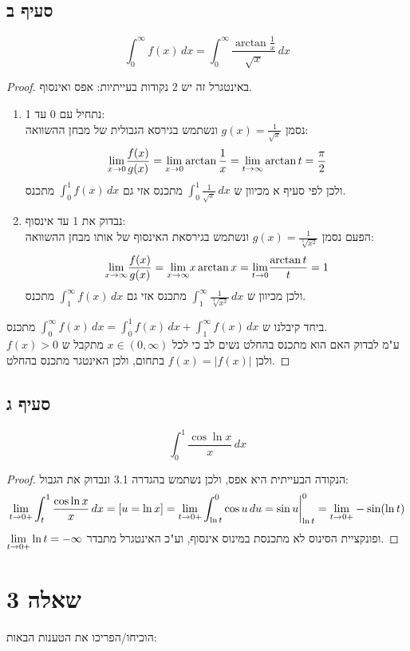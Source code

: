 \documentclass{article}
\begin{document}
	\pagebreak
	\subsection*{סעיף ב}
	\[
		\int_0^\infty f(x) \, dx = \int_0^\infty \frac{\arctan \frac{1}{x}}{\sqrt{x}} \, dx
	\]
	\begin{proof}
		באינטגרל זה יש 2 נקודות בעייתיות: אפס ואינסוף.
		\begin{enumerate}
			\item נתחיל עם 0 עד 1: \\
			נסמן $g(x) = \frac{1}{\sqrt{x}}$ ונשתמש בגירסא הגבולית של מבחן ההשוואה:
			\[
			\displaystyle{\lim_{x \to 0}} \frac{f(x)}{g(x)} = \displaystyle{\lim_{x \to 0}} \arctan \frac{1}{x} = \displaystyle{\lim_{t \to \infty}} \arctan t = \frac{\pi}{2}
			\]
			ולכן לפי סעיף א מכיוון ש $\int_0^1 \frac{1}{\sqrt{x}} \, dx$ מתכנס אזי גם $\int_0^1 f(x) \, dx$ מתכנס.

			\item נבדוק את 1 עד אינסוף: \\
			הפעם נסמן $g(x) = \frac{1}{\sqrt[3]{x^2}}$ ונשתמש בגירסאת האינסוף של אותו מבחן ההשוואה:
			\[
				\displaystyle{\lim_{x \to \infty}} \frac{f(x)}{g(x)} = \displaystyle{\lim_{x \to \infty}} x \arctan x = \displaystyle{\lim_{t \to 0}} \frac{\arctan t}{t} = 1
			\]
			ולכן מכיוון ש $\int_1^\infty \frac{1}{\sqrt[3]{x^2}} \, dx$ מתכנס אזי גם $\int_1^\infty f(x) \, dx$ מתכנס.
		\end{enumerate}
		ביחד קיבלנו ש $\int_0^\infty f(x) \, dx = \int_0^1 f(x) \, dx + \int_1^\infty f(x) \, dx$ מתכנס. \\
		ע"מ לבדוק האם הוא מתכנס בהחלט נשים לב כי לכל $x \in (0, \infty)$ מתקבל ש $f(x) > 0$ ולכן $f(x) = |f(x)|$ בתחום, ולכן האינטגר מתכנס בהחלט.
	\end{proof}

	\subsection*{סעיף ג}
	\[
		\int_0^1 \frac{\cos \ln x}{x} \, dx
	\]
	\begin{proof}
		הנקודה הבעייתית היא אפס, ולכן נשתמש בהגדרה 3.1 ונבדוק את הגבול:
		\[
		\displaystyle{\lim_{t \to 0+}} \int_t^1 \frac{\cos \ln x}{x} \, dx = [u = \ln x] =
		\displaystyle{\lim_{t \to 0+}} \int^0_{\ln t} \cos u \, du = \sin u \biggr|^0_{\ln t} =
		\displaystyle{\lim_{t \to 0+}} -\sin(\ln t)
		\]
		$\displaystyle{\lim_{t \to 0+}} \ln t = -\infty$ ופונקציית הסינוס לא מתכנסת במינוס אינסוף, וע"כ האינטגרל מתבדר.
	\end{proof}

	\pagebreak
	\section*{שאלה 3}
	הוכיחו/הפריכו את הטענות הבאות:
\end{document}
